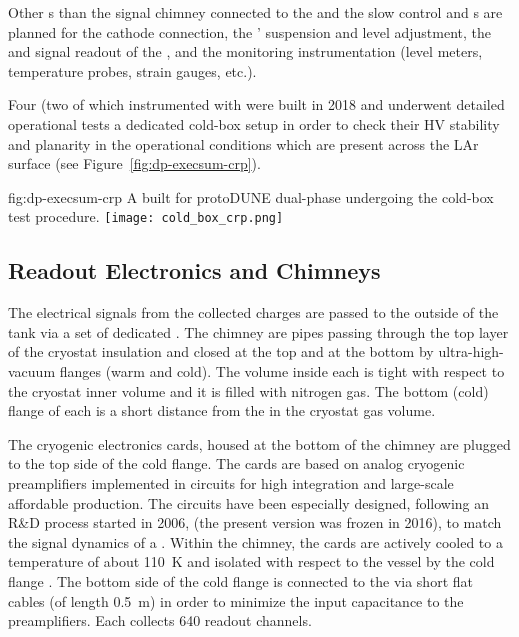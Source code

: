 Other \fdth{}s than the signal chimney connected to the  and the  slow control and \fdth{}s are planned for the cathode  connection, the ' suspension and level adjustment, the  and signal readout of the , and the monitoring instrumentation (level meters, temperature probes, strain gauges, etc.).

Four  (two of which instrumented with  were built in 2018 and underwent detailed operational tests a dedicated cold-box setup in order to check their HV stability and planarity in the operational conditions which are present across the LAr surface (see Figure~\ref{fig:dp-execsum-crp}). 

\begin{dunefigure}{fig:dp-execsum-crp}
  {A   built for protoDUNE dual-phase undergoing the cold-box test procedure.}
  \texttt{[image: cold\_box\_crp.png]}
\end{dunefigure}



\subsection{Readout Electronics and Chimneys}
\label{sec:dp-execsum-electronics}

The electrical signals from the collected charges are passed to the outside of the tank via a set of dedicated . The chimney are pipes passing through the top layer of the cryostat insulation and closed at the top and at the bottom by ultra-high-vacuum flanges (warm and cold). The volume inside each  is tight with respect to the cryostat inner volume and it is filled with nitrogen gas. The bottom (cold) flange of each  is a short distance  from the  in the cryostat gas volume.

The cryogenic  electronics cards, housed at the bottom of the chimney are plugged to the top side of  the cold flange. The  cards are based on analog cryogenic preamplifiers implemented in   circuits for high integration and large-scale affordable production. 
The  circuits have been especially designed, following an R\&D process started in 2006, (the present version was frozen in 2016), to match the signal dynamics of a . Within the chimney, the cards are actively cooled to a temperature of about \SI{110}{K} and isolated with respect to the \lar vessel by the cold flange \fdth{}.  The bottom side of the cold flange is connected to the  via short flat cables (of length \SI{0.5}{m}) in order to minimize the input capacitance to the preamplifiers. Each  collects \num{640} readout channels. 

